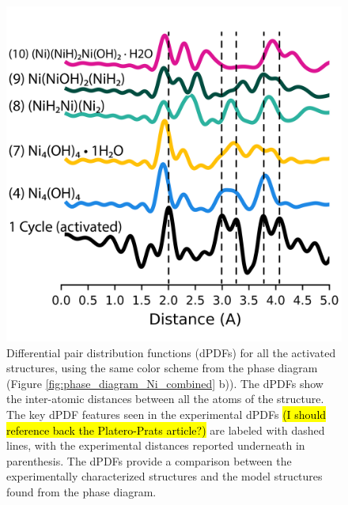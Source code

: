 \documentclass[journal=jctcce,manuscript=article]{achemso}
\begin{document}
\begin{figure}[H]
    \centering
    \includegraphics{zi-images/01-Ni-Graphics/2021-03-02-Ni-fixed-dPDFs-manuscript.png}
    \caption{Differential pair distribution functions (dPDFs) for all the activated structures, using the same color scheme from the  phase diagram (Figure \ref{fig:phase_diagram_Ni_combined} b)). The dPDFs show the inter-atomic distances between all the atoms of the structure. The key dPDF features seen in the experimental dPDFs \hl{(I should reference back the Platero-Prats article?)} are labeled with dashed lines, with the experimental distances reported underneath in parenthesis. The dPDFs provide a comparison between the experimentally characterized structures and the model structures found from the phase diagram.}
    \label{fig:dPDFs_TandP_fixed_Ni}
\end{figure}
\end{document}
